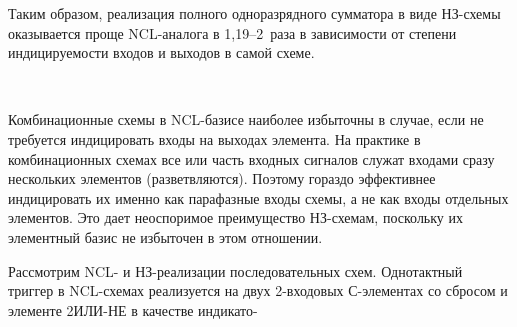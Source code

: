 \begin{multicols}{2}

      
       

       
      
       
       Таким образом, реализация полного одноразрядного сумматора в виде НЗ-схе\-мы 
оказывается проще NCL-аналога в 1,19--2~раза в зависимости от степени индицируемости 
входов и выходов в самой схеме. 

\begin{figure*} %
   \vspace*{1pt}
 \begin{center}
 \mbox{%
 \epsfxsize=155.444mm
 }
 \end{center}
 \vspace*{-6pt}
\vspace*{3pt}
\end{figure*}








      
Комбинационные схемы в NCL-ба\-зи\-се наиболее избыточны в случае, если не требуется 
индицировать входы на выходах элемента. На практике в комбинационных схемах все или 
часть входных сигналов служат входами сразу нескольких элементов (разветвляются). 
Поэтому гораздо эффективнее индицировать их именно как парафазные входы схемы, а не 
как входы отдельных элементов. Это дает неоспоримое преимущество НЗ-схе\-мам, 
поскольку их элементный базис не избыточен в этом отношении.
       
       Рассмотрим NCL- и НЗ-реа\-ли\-за\-ции последовательных схем. Однотактный 
триггер в NCL-схе\-мах реализуется на двух 2-вхо\-до\-вых С-эле\-мен\-тах со сбросом и 
элементе 2ИЛИ-НЕ в качестве индикато-\linebreak

\vspace*{6pt}


\noindent
\begin{center}  %

\vspace*{-6pt}
\mbox{%
 \epsfxsize=77.713mm
 }
  \end{center}

  \vspace*{-3pt}


\end{multicols}
